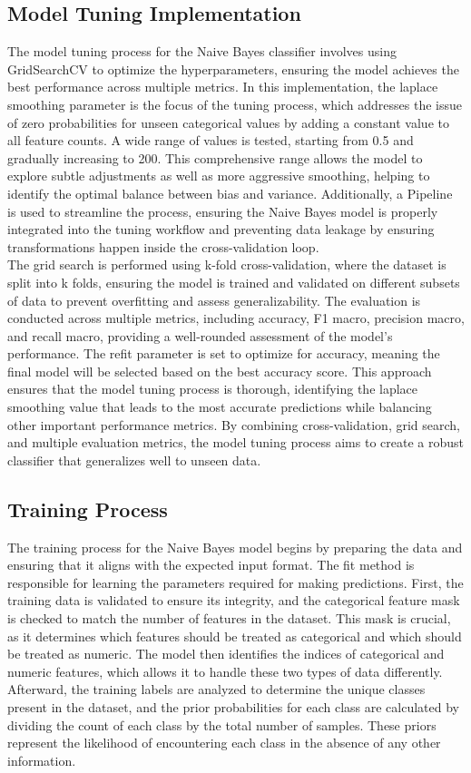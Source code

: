 \subsection{Model Tuning Implementation}
The model tuning process for the Naive Bayes classifier involves using GridSearchCV to optimize the hyperparameters, ensuring the model achieves the best performance across multiple metrics. In this implementation, the laplace smoothing parameter is the focus of the tuning process, which addresses the issue of zero probabilities for unseen categorical values by adding a constant value to all feature counts. A wide range of values is tested, starting from 0.5 and gradually increasing to 200. This comprehensive range allows the model to explore subtle adjustments as well as more aggressive smoothing, helping to identify the optimal balance between bias and variance. Additionally, a Pipeline is used to streamline the process, ensuring the Naive Bayes model is properly integrated into the tuning workflow and preventing data leakage by ensuring transformations happen inside the cross-validation loop.\\

The grid search is performed using k-fold cross-validation, where the dataset is split into k folds, ensuring the model is trained and validated on different subsets of data to prevent overfitting and assess generalizability. The evaluation is conducted across multiple metrics, including accuracy, F1 macro, precision macro, and recall macro, providing a well-rounded assessment of the model’s performance. The refit parameter is set to optimize for accuracy, meaning the final model will be selected based on the best accuracy score. This approach ensures that the model tuning process is thorough, identifying the laplace smoothing value that leads to the most accurate predictions while balancing other important performance metrics. By combining cross-validation, grid search, and multiple evaluation metrics, the model tuning process aims to create a robust classifier that generalizes well to unseen data.

\subsection{Training Process}
The training process for the Naive Bayes model begins by preparing the data and ensuring that it aligns with the expected input format. The fit method is responsible for learning the parameters required for making predictions. First, the training data is validated to ensure its integrity, and the categorical feature mask is checked to match the number of features in the dataset. This mask is crucial, as it determines which features should be treated as categorical and which should be treated as numeric. The model then identifies the indices of categorical and numeric features, which allows it to handle these two types of data differently. Afterward, the training labels are analyzed to determine the unique classes present in the dataset, and the prior probabilities for each class are calculated by dividing the count of each class by the total number of samples. These priors represent the likelihood of encountering each class in the absence of any other information.\\

